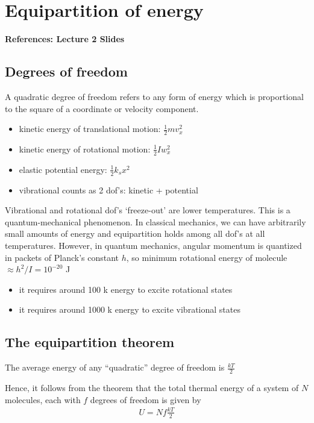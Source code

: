 \documentclass[11pt]{article}
\begin{document}
\section{Equipartition of energy}
\textbf{References: Lecture 2 Slides} \bigskip

\subsection{Degrees of freedom}
A quadratic degree of freedom refers to any form of energy which is proportional to the square of a coordinate or velocity component.
\begin{itemize}
    \item kinetic energy of translational motion: $\frac{1}{2} mv_x^2$
    \item kinetic energy of rotational motion: $\frac{1}{2}I w_x^2$
    \item elastic potential energy: $\frac{1}{2}k_s x^2$
    \item vibrational counts as 2 dof's: kinetic + potential 
\end{itemize}
Vibrational and rotational dof's `freeze-out' are lower temperatures. This is a quantum-mechanical phenomenon. In classical mechanics, we can have arbitrarily small amounts of energy and equipartition holds among all dof's at all temperatures. However, in quantum mechanics, angular momentum is quantized in packets of Planck's constant $h$, so minimum rotational energy of molecule $\approx h^2/I = 10^{-20}$ J 
\begin{itemize}
\item it requires around 100 k energy to excite rotational states
\item it requires around 1000 k energy to excite vibrational states
\end{itemize}



\subsection{The equipartition theorem}

The average energy of any ``quadratic'' degree of freedom is $\frac{kT}{2}$

Hence, it follows from the theorem that the total thermal energy of a system of $N$ molecules, each with $f$ degrees of freedom is given by 
\begin{align*}
    U = Nf\frac{kT}{2}
\end{align*}
\end{document}
